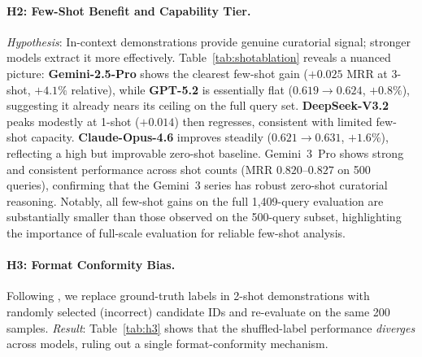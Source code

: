 \documentclass[11pt]{article}
\begin{document}
\paragraph{H2: Few-Shot Benefit and Capability Tier.}
\label{h2}
\emph{Hypothesis}: In-context demonstrations provide genuine curatorial signal;
stronger models extract it more effectively.
Table~\ref{tab:shotablation} reveals a nuanced picture:
\textbf{Gemini-2.5-Pro} shows the clearest few-shot gain
($+0.025$ MRR at 3-shot, $+4.1\%$ relative),
while \textbf{GPT-5.2} is essentially flat ($0.619{\to}0.624$, $+0.8\%$),
suggesting it already nears its ceiling on the full query set.
\textbf{DeepSeek-V3.2} peaks modestly at 1-shot ($+0.014$) then regresses,
consistent with limited few-shot capacity.
\textbf{Claude-Opus-4.6} improves steadily ($0.621{\to}0.631$, $+1.6\%$),
reflecting a high but improvable zero-shot baseline.
Gemini~3~Pro shows strong and consistent performance across shot counts
(MRR $0.820$--$0.827$ on 500 queries), confirming that the Gemini~3 series has
robust zero-shot curatorial reasoning.
Notably, all few-shot gains on the full 1{,}409-query evaluation are substantially
smaller than those observed on the 500-query subset, highlighting the
importance of full-scale evaluation for reliable few-shot analysis.

\paragraph{H3: Format Conformity Bias.}
\label{h3}
Following \citet{min2022rethinking}, we replace ground-truth labels
in 2-shot demonstrations with randomly selected (incorrect) candidate IDs
and re-evaluate on the same 200 samples.
\emph{Result}: Table~\ref{tab:h3} shows that the shuffled-label
performance \emph{diverges} across models, ruling out a single
format-conformity mechanism.

\begin{table}[!t]
\centering\small
\setlength{\tabcolsep}{5pt}
\caption{Shuffled-label experiment ($\Delta = \text{MRR}_{\text{shuffled}} - \text{MRR}_{\text{gold}}$). Positive $\Delta$ = model unaffected or misled by gold labels; negative $\Delta$ = model learns from demonstration content.}
\label{tab:h3}
\end{table}
\end{document}
